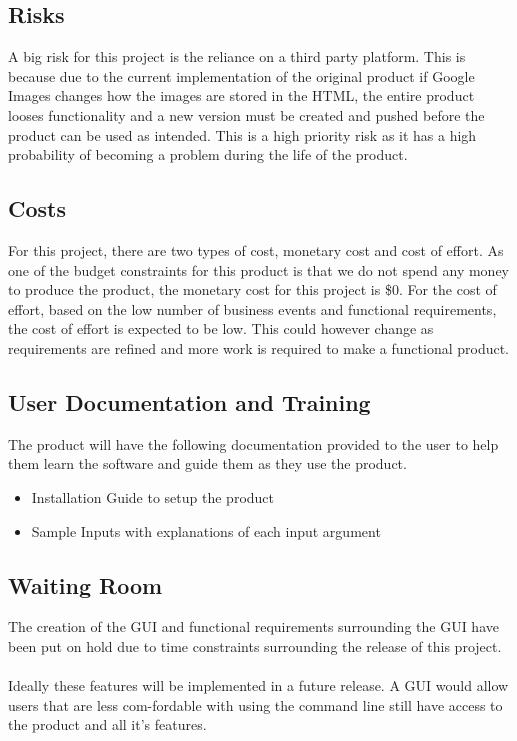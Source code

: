 \documentclass[12pt, titlepage]{article}
\begin{document}
\subsection{Risks}

A big risk for this project is the reliance on a third party platform. This is because due to the current implementation of the original product if Google Images changes how the images are stored in the HTML, the entire product looses functionality and a new version must be created and pushed before the product can be used as intended. This is a high priority risk as it has a high probability of becoming a problem during the life of the product.

\subsection{Costs}

For this project, there are two types of cost, monetary cost and cost of effort. As one of the budget constraints for this product is that we do not spend any money to produce the product, the monetary cost for this project is \$0. For the cost of effort, based on the low number of business events and functional requirements, the cost of effort is expected to be low. This could however change as requirements are refined and more work is required to make a functional product.

\subsection{User Documentation and Training}

The product will have the following documentation provided to the user to help them learn the software and guide them as they use the product.

\begin{itemize}
    \item Installation Guide to setup the product
    \item Sample Inputs with explanations of each input argument
\end{itemize}

\subsection{Waiting Room}

The creation of the GUI and functional requirements surrounding the GUI have been put on hold due to time constraints surrounding the release of this project.
\\ \\
Ideally these features will be implemented in a future release. A GUI would allow users that are less com-fordable with using the command line still have access to the product and all it's features.
\end{document}
